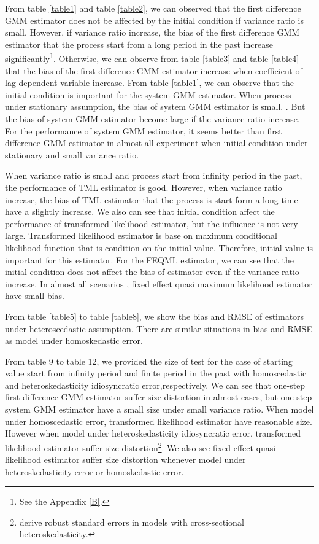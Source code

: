 \documentclass[12pt,a4paper,hyperref]{article}
\begin{document}
From table \ref{table1} and table \ref{table2}, we can observed that the first difference GMM estimator does not be affected by the initial condition if variance ratio is small. 
However, if variance ratio increase, the bias of the first difference GMM estimator that the process start from a long period in the past increase significantly\footnote{See the Appendix \ref{B}.}. Otherwise, we can observe from table \ref{table3} and table \ref{table4} that the bias of the first difference GMM estimator increase when coefficient of lag dependent variable increase.          
From table \ref{table1}, we can observe that the initial condition is important for the system GMM estimator. When process under stationary assumption, the bias of system GMM estimator is small. . But the bias of system GMM estimator become large if the variance ratio increase.  
For the performance of system GMM estimator, it seems better than first difference GMM estimator in almost all experiment when initial condition under stationary and small variance ratio.



When variance ratio is small and process start from infinity period in the past, the performance of TML estimator is good. However, when variance ratio increase, the bias of TML estimator that the process is start form a long time have a slightly increase. 
We also can see that initial condition affect the performance of transformed likelihood estimator, but the influence is not very large. Transformed likelihood estimator is base on maximum conditional likelihood function that is condition on the initial value. Therefore, initial value is important for this estimator.
For the FEQML estimator, we can see that the initial condition does not affect the bias of estimator even if the variance ratio increase.  In almost all scenarios , fixed effect quasi maximum likelihood estimator have small bias. 



From table \ref{table5} to table \ref{table8}, we show the bias and RMSE of estimators under heteroscedastic assumption. There are similar situations in bias and RMSE as model under homoskedastic error.

From table 9 to table 12, we provided the size of test for the case of starting value start from infinity period and finite period in the past with homoscedastic and heteroskedasticity idiosyncratic error,respectively. 
We can see that one-step first difference GMM estimator suffer size distortion in almost cases, but  one step system GMM estimator have a small size under small variance ratio.
 When model under homoscedastic error, transformed likelihood estimator have reasonable size. However when model under heteroskedasticity idiosyncratic error, transformed likelihood estimator suffer size distortion\footnote{\citet{Hayakawa:2015} derive robust standard errors in models with cross-sectional heteroskedasticity.}.  We also see fixed effect quasi likelihood estimator suffer size distortion whenever model under heteroskedasticity error or homoskedastic error. 
\end{document}
